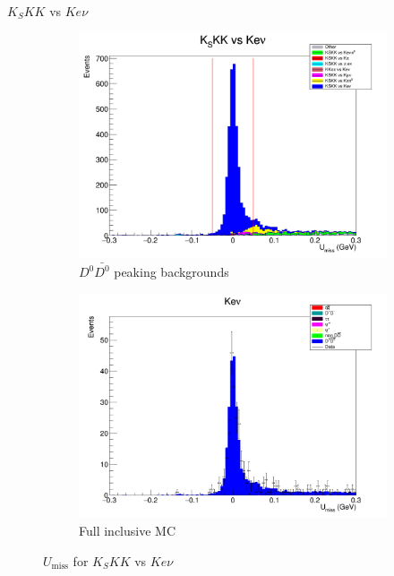 \documentclass{beamer}
\begin{document}
\begin{frame}{$K_SKK$ vs $Ke\nu$}
  \begin{figure}
    \centering
    \begin{subfigure}{0.5\textwidth}
      \centering
      \includegraphics[width=\textwidth]{KSKKVersusKeNuPeaking.png}
      \caption{$D^0\bar{D^0}$ peaking backgrounds}
    \end{subfigure}%
    \begin{subfigure}{0.5\textwidth}
      \centering
      \includegraphics[width=\textwidth]{KSKKVersusKeNuDataInclusiveMC.png}
      \caption{Full inclusive MC}
    \end{subfigure}
    \caption{$U_\text{miss}$ for $K_SKK$ vs $Ke\nu$}
  \end{figure}
\end{frame}
\end{document}
